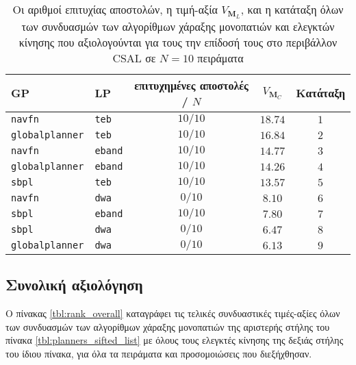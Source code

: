 \begin{table}[htb]\centering
\renewcommand{\arraystretch}{1.3}
\begin{tabular}{llccc}
  GP                     & LP             & επιτυχημένες αποστολές / $N$ & $V_{\bm{M}_C}$ & Κατάταξη \\ \toprule
  \texttt{navfn}         & \texttt{teb}   & $10/10$                      & $18.74$        & $1$      \\
  \texttt{globalplanner} & \texttt{teb}   & $10/10$                      & $16.84$        & $2$      \\
  \texttt{navfn}         & \texttt{eband} & $10/10$                      & $14.77$        & $3$      \\
  \texttt{globalplanner} & \texttt{eband} & $10/10$                      & $14.26$        & $4$      \\
  \texttt{sbpl}          & \texttt{teb}   & $10/10$                      & $13.57$        & $5$      \\
  \texttt{navfn}         & \texttt{dwa}   & $0/10$                       & $8.10$         & $6$      \\
  \texttt{sbpl}          & \texttt{eband} & $10/10$                      & $7.80$         & $7$      \\
  \texttt{sbpl}          & \texttt{dwa}   & $0/10$                       & $6.47$         & $8$      \\
  \texttt{globalplanner} & \texttt{dwa}   & $0/10$                       & $6.13$         & $9$      \\ \bottomrule
\end{tabular}
\caption{\small Οι αριθμοί επιτυχίας αποστολών, η τιμή-αξία $V_{\bm{M}_L}$, και
         η κατάταξη όλων των συνδυασμών των αλγορίθμων χάραξης μονοπατιών και
         ελεγκτών κίνησης που αξιολογούνται για τους την επίδοσή τους στο
         περιβάλλον CSAL σε $N=10$ πειράματα}
\label{tbl:rank_csal}
\end{table}


\subsection{Συνολική αξιολόγηση}
  \label{subsection:02_01_04:05}

Ο πίνακας \ref{tbl:rank_overall} καταγράφει τις τελικές συνδυαστικές τιμές-αξίες
όλων των συνδυασμών των αλγορίθμων χάραξης μονοπατιών της αριστερής στήλης
του πίνακα \ref{tbl:planners_sifted_list} με όλους τους ελεγκτές κίνησης της
δεξιάς στήλης του ίδιου πίνακα, για όλα τα πειράματα και προσομοιώσεις που
διεξήχθησαν.

